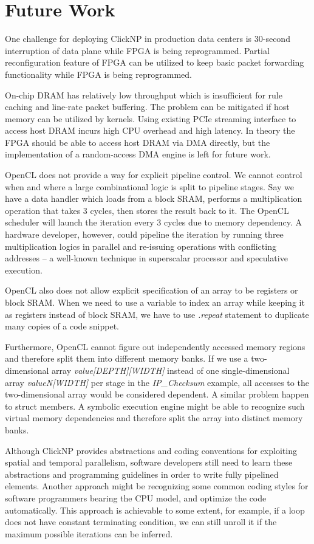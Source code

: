\section{Future Work}
\label{sec:future}

One challenge for deploying ClickNP in production data centers is 30-second interruption of data plane while FPGA is being reprogrammed. Partial reconfiguration \cite{bourgeault2011alteras} feature of FPGA can be utilized to keep basic packet forwarding functionality while FPGA is being reprogrammed.

On-chip DRAM has relatively low throughput which is insufficient for rule caching and line-rate packet buffering. The problem can be mitigated if host memory can be utilized by kernels. Using existing PCIe streaming interface to access host DRAM incurs high CPU overhead and high latency. In theory the FPGA should be able to access host DRAM via DMA directly, but the implementation of a random-access DMA engine is left for future work.

OpenCL does not provide a way for explicit pipeline control. We cannot control when and where a large combinational logic is split to pipeline stages. Say we have a data handler which loads from a block SRAM, performs a multiplication operation that takes 3 cycles, then stores the result back to it. The OpenCL scheduler will launch the iteration every 3 cycles due to memory dependency. A hardware developer, however, could pipeline the iteration by running three multiplication logics in parallel and re-issuing operations with conflicting addresses -- a well-known technique in superscalar processor and speculative execution.

OpenCL also does not allow explicit specification of an array to be registers or block SRAM. When we need to use a variable to index an array while keeping it as registers instead of block SRAM, we have to use \textit{.repeat} statement to duplicate many copies of a code snippet.

Furthermore, OpenCL cannot figure out independently accessed memory regions and therefore split them into different memory banks. If we use a two-dimensional array \textit{value[DEPTH][WIDTH]} instead of one single-dimensional array \textit{valueN[WIDTH]} per stage in the \textit{IP\_Checksum} example, all accesses to the two-dimensional array would be considered dependent. A similar problem happen to struct members. A symbolic execution engine might be able to recognize such virtual memory dependencies and therefore split the array into distinct memory banks.

Although ClickNP provides abstractions and coding conventions for exploiting spatial and temporal parallelism, software developers still need to learn these abstractions and programming guidelines in order to write fully pipelined elements. Another approach might be recognizing some common coding styles for software programmers bearing the CPU model, and optimize the code automatically. This approach is achievable to some extent, for example, if a loop does not have constant terminating condition, we can still unroll it if the maximum possible iterations can be inferred.